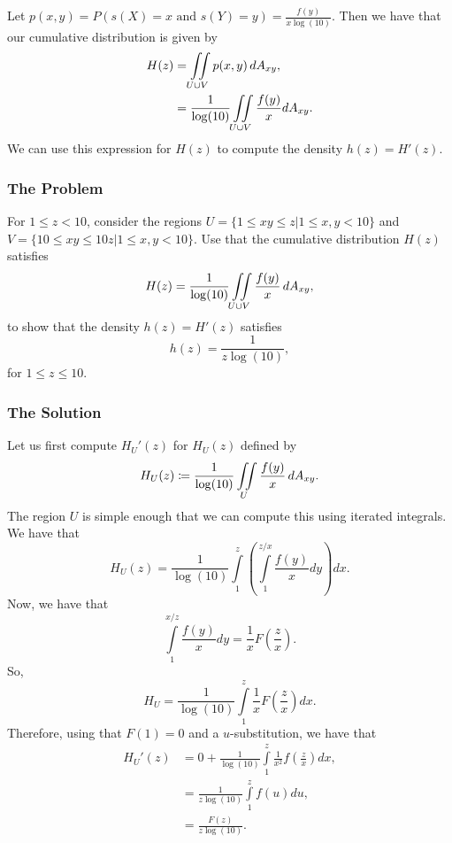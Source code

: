 Let \(p(x,y) = P(s(X) = x \text{ and } s(Y) = y) = \frac{f(y)}{x\log(10)}\). Then we have that our cumulative distribution is given by
\begin{align}
H(z) & = \iint\limits_{U\cup V} p(x,y) \, dA_{xy}, \\ 
& = \frac{1}{\log(10)} \iint \limits_{U\cup V} \frac{f(y)}{x}  dA_{xy}.
\end{align}
We can use this expression for \(H(z)\) to compute the density \(h(z) = H'(z)\).

\subsubsection*{The Problem}

For \(1 \leq z < 10\), consider the regions \(U = \{1 \leq xy \leq z | 1 \leq x, y < 10 \}\) and \(V = \{10 \leq xy \leq 10z | 1 \leq x, y < 10\}\). Use that the
cumulative distribution \(H(z)\) satisfies 
\begin{equation}
H(z) = \frac{1}{\log(10)} \iint\limits_{U \cup V} \frac{f(y)}{x} \, dA_{xy}, 
\end{equation}
to show that the density \(h(z) = H'(z)\) satisfies
\begin{equation}
h(z) = \frac{1}{z\log(10)},
\end{equation}
for \(1 \leq z \leq 10\).

\subsubsection*{The Solution}

Let us first compute \(H_U'(z)\) for \(H_U(z)\) defined by
\begin{equation}
H_U(z) \coloneqq \frac{1}{\log(10)} \iint\limits_U \frac{f(y)}{x}\, dA_{xy}. 
\end{equation}
The region \(U\) is simple enough that we can compute this using iterated integrals. We have that
\begin{equation}
H_U(z) = \frac{1}{\log(10)}\int\limits_{1}^{z} \left( \int\limits_{1}^{z/x} \frac{f(y)}{x} dy\right) dx. 
\end{equation}
Now, we have that
\begin{equation}
\int\limits_{1}^{x/z} \frac{f(y)}{x} dy = \frac{1}{x} F\left(\frac{z}{x}\right).
\end{equation}
So,
\begin{equation}
H_U = \frac{1}{\log(10)}\int\limits_1^z \frac{1}{x} F\left(\frac{z}{x}\right) dx. 
\end{equation}
Therefore, using that \(F(1) = 0\) and a \(u\)-substitution, we have that
\begin{align}
H_U'(z) & = 0 + \frac{1}{\log(10)} \int\limits_1^z \frac{1}{x^2} f\left(\frac{z}{x}\right) dx, \\ 
    & = \frac{1}{z\log(10)} \int\limits_1^{z} f(u) du, \\
& = \frac{F(z)}{z\log(10)}.
\end{align}
